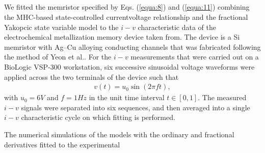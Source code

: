 \documentclass[10pt]{article}
\begin{document}
\begin{multicols}{2}
{{\section{ }
}
We fitted the memristor specified by Eqs. (\ref{equa:8}) and (\ref{equa:11}) combining the MHC-based state-controlled currentvoltage relationship and the fractional Yakopcic state variable model to the $i-v$ characteristic data of the electrochemical metallization memory device taken from. The device is a Si memristor with Ag–Cu alloying conducting channels that was fabricated following the method of Yeon et al.. For the $i-v$ measurements that were carried out on a BioLogic VSP-300 workstation, six successive sinusoidal voltage waveforms were applied across the two terminals of the device such that
\begin{align}
   v(t) = u_0 \sin(2\pi ft),
\end{align}
with $u_0 = 6 V$ and $f = 1 Hz$ in the unit time interval $t \in [0,1]$. The measured $i-v$ signals were separated into six sequences, and then averaged into a single $i-v$ characteristic cycle on which fitting is performed. \par
The numerical simulations of the models with the ordinary and fractional derivatives fitted to the experimental

}
\end{multicols}
\end{document}
